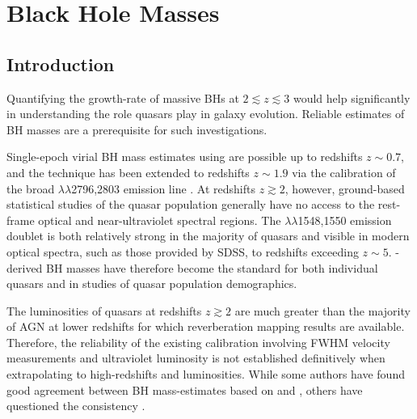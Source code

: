 
\chapter{Black Hole Masses}
\label{ch:bhmass}

\section{Introduction}

Quantifying the growth-rate of massive BHs at $2 \lesssim z \lesssim 3$ would help significantly in understanding the role quasars play in galaxy evolution.
Reliable estimates of BH masses are a prerequisite for such investigations. 

Single-epoch virial BH mass estimates using \hb are possible up to redshifts $z\sim0.7$, and the technique has been extended to redshifts $z\sim1.9$ via the calibration of the broad $\lambda\lambda$2796,2803 emission line \citep{mclure02,onken08,wang09,rafiee11}. 
At redshifts $z\gtrsim2$, however, ground-based statistical studies of the quasar population generally have no access to the rest-frame optical and near-ultraviolet spectral regions.
The $\lambda\lambda$1548,1550 emission doublet is both relatively strong in the majority of quasars and visible in modern optical spectra, such as those provided by SDSS, to redshifts exceeding $z\sim5$. 
-derived BH masses have therefore become the standard \citep[e.g.][]{vestergaard06,park13} for both individual quasars and in studies of quasar population demographics.

The luminosities of quasars at redshifts $z\gtrsim 2$ are much greater than the majority of AGN at lower redshifts for which reverberation mapping results are available.  
Therefore, the reliability of the existing calibration involving  FWHM velocity measurements and ultraviolet luminosity is not established definitively when extrapolating to high-redshifts and luminosities. 
While some authors have found good agreement between BH mass-estimates based on  and \hb \citep[e.g.][]{vestergaard06, assef11, tilton13}, others have questioned the consistency \citep[e.g.][]{baskin05,trakhtenbrot12,shen12}.  

